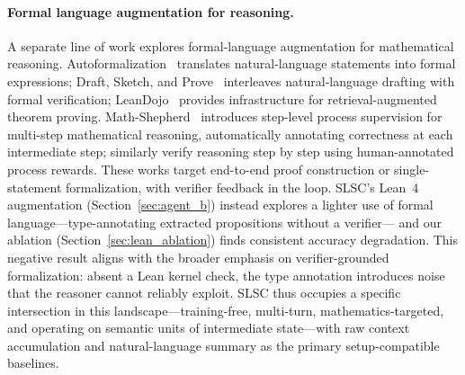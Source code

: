 \paragraph{Formal language augmentation for reasoning.}
A separate line of work explores formal-language augmentation for mathematical reasoning. Autoformalization~\citep{wu2022autoformalization}
translates natural-language statements into formal expressions; Draft, Sketch, and Prove~\citep{jiang2023draft} interleaves natural-language
drafting with formal verification; LeanDojo~\citep{yang2023leandojo} provides infrastructure for retrieval-augmented theorem proving.
Math-Shepherd~\citep{wang2024mathshepherd} introduces step-level process supervision for multi-step mathematical reasoning, automatically
annotating correctness at each intermediate step; \citet{lightman2024lets} similarly verify reasoning step by step using human-annotated process rewards. These works target end-to-end proof construction or single-statement formalization, with verifier feedback in the loop. SLSC's Lean~4 augmentation
(Section~\ref{sec:agent_b}) instead explores a lighter use of formal language---type-annotating extracted propositions without a verifier---
and our ablation (Section~\ref{sec:lean_ablation}) finds consistent accuracy degradation. This negative result aligns with the broader emphasis on
verifier-grounded formalization: absent a Lean kernel check, the type annotation introduces noise that the reasoner cannot reliably exploit.
SLSC thus occupies a specific intersection in this landscape---training-free, multi-turn, mathematics-targeted, and operating on semantic units
of intermediate state---with raw context accumulation and natural-language summary as the primary setup-compatible baselines.